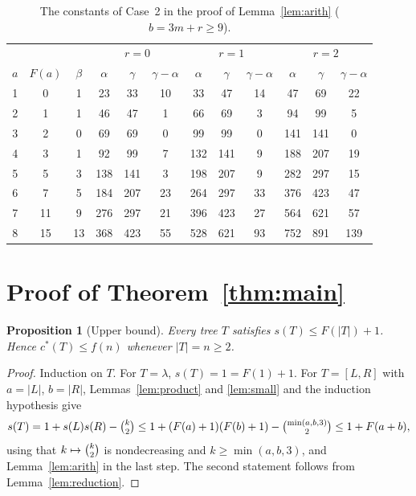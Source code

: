 \documentclass[11pt]{amsart}
\newtheorem{proposition}[theorem]{Proposition}
\theoremstyle{definition}
\theoremstyle{remark}
\newcommand{\lf}{\lambda}
\newcommand{\cstar}{c^{*}}
\newcommand{\binomtwo}[1]{\tbinom{#1}{2}}
\begin{document}
\begin{table}[t]
\centering
\small
\begin{tabular}{ccc|ccc|ccc|ccc}
\toprule
& & & \multicolumn{3}{c|}{$r=0$} & \multicolumn{3}{c|}{$r=1$} & \multicolumn{3}{c}{$r=2$}\\
$a$ & $F(a)$ & $\beta$ & $\alpha$ & $\gamma$ & $\gamma-\alpha$ & $\alpha$ & $\gamma$ & $\gamma-\alpha$ & $\alpha$ & $\gamma$ & $\gamma-\alpha$\\
\midrule
1 & 0 & 1 & 23 & 33 & 10 & 33 & 47 & 14 & 47 & 69 & 22 \\
2 & 1 & 1 & 46 & 47 & 1 & 66 & 69 & 3 & 94 & 99 & 5 \\
3 & 2 & 0 & 69 & 69 & 0 & 99 & 99 & 0 & 141 & 141 & 0 \\
4 & 3 & 1 & 92 & 99 & 7 & 132 & 141 & 9 & 188 & 207 & 19 \\
5 & 5 & 3 & 138 & 141 & 3 & 198 & 207 & 9 & 282 & 297 & 15 \\
6 & 7 & 5 & 184 & 207 & 23 & 264 & 297 & 33 & 376 & 423 & 47 \\
7 & 11 & 9 & 276 & 297 & 21 & 396 & 423 & 27 & 564 & 621 & 57 \\
8 & 15 & 13 & 368 & 423 & 55 & 528 & 621 & 93 & 752 & 891 & 139 \\
\bottomrule
\end{tabular}
\medskip
\caption{The constants of Case~2 in the proof of Lemma~\ref{lem:arith} ($b=3m+r\ge 9$).}
\label{tab:case2}
\end{table}

\section{Proof of Theorem~\ref{thm:main}}\label{sec:main}

\begin{proposition}[Upper bound]\label{prop:upper}
Every tree $T$ satisfies $s(T)\le F(|T|)+1$.
Hence $\cstar(T)\le f(n)$ whenever $|T|=n\ge 2$.
\end{proposition}

\begin{proof}
Induction on $T$.
For $T=\lf$, $s(T)=1=F(1)+1$.
For $T=[L,R]$ with $a=|L|$, $b=|R|$, Lemmas~\ref{lem:product} and \ref{lem:small} and the induction hypothesis give
\[
s(T)=1+s(L)s(R)-\binomtwo{k}\le 1+(F(a)+1)(F(b)+1)-\binomtwo{\min(a,b,3)}\le 1+F(a+b),
\]
using that $k\mapsto\binomtwo{k}$ is nondecreasing and $k\ge\min(a,b,3)$, and Lemma~\ref{lem:arith} in the last step.
The second statement follows from Lemma~\ref{lem:reduction}.
\end{proof}
\end{document}
